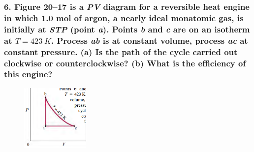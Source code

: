 \documentclass{article}
\begin{document}
\subsubsection*{
    6. Figure 20–17 is a \textit{PV} diagram for a reversible heat
    engine in which 1.0 mol of argon, a nearly ideal
    monatomic gas, is initially at \textit{STP} (point \textit{a}).
    Points \textit{b} and \textit{c} are on an isotherm at $T = 423\:K$.
    Process \textit{ab} is at constant
    volume, process \textit{ac} at constant
    pressure. (\textbf{a}) Is the path of the
    cycle carried out clockwise or
    counterclockwise? (\textbf{b}) What is
    the efficiency of this engine?
}
\begin{figure}[h]
    \includegraphics[width=0.3\textwidth]{figures/20-17.png}
\end{figure}
\end{document}
